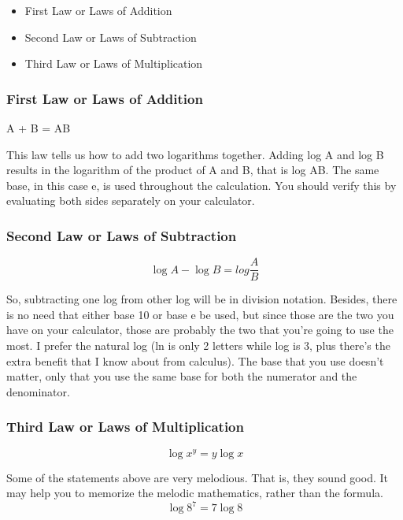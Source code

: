 \documentclass[12pt, a4paper]{article}
\begin{document}
 
\begin{itemize}
  \item First Law or Laws of Addition
  \item Second Law or Laws of Subtraction
  \item Third Law or Laws of Multiplication
\end{itemize}

\subsubsection*{First Law or Laws of Addition}
\begin{tcolorbox}
\center
\log A + \log B = \log AB\\

\end{tcolorbox}
\noindent
This law tells us how to add two logarithms together. Adding log A and log B results in the logarithm of the product of A and B, that is log AB. The same base, in this case e, is used throughout the calculation. You should verify this by evaluating
both sides separately on your calculator.

\subsubsection*{Second Law or Laws of Subtraction}
\begin{tcolorbox}
\center
$$\log A - \log B = log\frac {A }{B}$$
\end{tcolorbox}
\noindent
So, subtracting one log from other log will be in division notation. Besides, there is no need that either base 10 or base e be used, but since those are the two you have on your calculator, those are probably the two that you're going to use the most. I prefer the natural log (ln is only 2 letters while log is 3, plus there's the extra benefit that I know about from calculus). The base that you use doesn't matter, only that you use the same base for both the numerator and the denominator.

\subsubsection*{Third Law or Laws of Multiplication}
\begin{tcolorbox}
\center
$$\log x^y = y \log x$$
\end{tcolorbox}
\noindent
Some of the statements above are very melodious. That is, they sound good. It may help you to memorize the melodic mathematics, rather than the formula.
$$\log 8^7 = 7 \log 8$$
\end{document}
